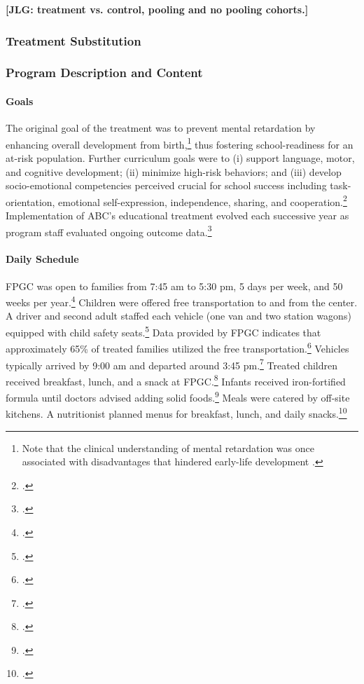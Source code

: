 \noindent \textbf{[JLG: treatment vs. control, pooling and no pooling cohorts.]}\\

\subsubsection{Treatment Substitution}

\subsubsection{Program Description and Content}

\paragraph{Goals}
\noindent The original goal of the treatment was to prevent mental retardation by enhancing overall development from birth,\footnote{Note that the clinical understanding of mental retardation was once associated with disadvantages that hindered early-life development \citep{Mental-Retardation_America_2004_BOOK_NYU}.} thus fostering school-readiness for an at-risk population. Further curriculum goals were to (i) support language, motor, and cognitive development; (ii) minimize high-risk behaviors; and (iii) develop socio-emotional competencies perceived crucial for school success including task-orientation, emotional self-expression, independence, sharing, and cooperation.\footnote{\citet{Sparling_1974_Synth_Edu_Infant_SPEECH,Ramey_Collier_etal_1976_CarolinaAbecedarianProject,Ramey-etal_2012-ABC}.} Implementation of ABC's educational treatment evolved each successive year as program staff evaluated ongoing outcome data.\footnote{ \citet{McGinness_1982_Language-Poverty-Child,Haskins_1985_CD,Finkelstein_1982_Day_Care_YC,Ramey-etal_1975_AJoMD}.}\\


\paragraph{Daily Schedule}
\noindent FPGC was open to families from 7:45 am to 5:30 pm, 5 days per week, and 50 weeks per year.\footnote{\citet{Ramey_Collier_etal_1976_CarolinaAbecedarianProject}.} Children were offered free transportation to and from the center. A driver and second adult staffed each vehicle (one van and two station wagons) equipped with child safety seats.\footnote{\citet{Ramey_Campbell_1979_SR,abc2014-2015interviews}.} Data provided by FPGC indicates that approximately 65\% of treated families utilized the free transportation.\footnote{\citet{Barnett_Masse_2002_benefitcost}.} Vehicles typically arrived by 9:00 am and departed around 3:45 pm.\footnote{\citet{Ramey-et-al_1977_Intro-to-ABC}.} Treated children received breakfast, lunch, and a snack at FPGC.\footnote{ \citet{Haskins_1985_CD}.} Infants received iron-fortified formula until doctors advised adding solid foods.\footnote{\citet{Campbell_Conti_etal_2014_EarlyChildhoodInvestments,abc2014-2015interviews}.} Meals were catered by off-site kitchens. A nutritionist planned menus for breakfast, lunch, and daily snacks.\footnote{\citet{Ramey-et-al_1977_Intro-to-ABC}.}\\

